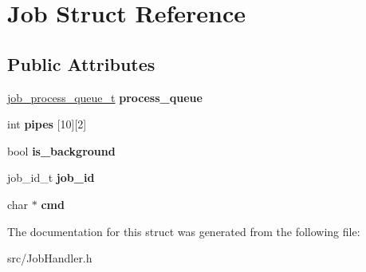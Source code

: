 \hypertarget{structJob}{\section{Job Struct Reference}
\label{structJob}
}
\subsection*{Public Attributes}
\begin{DoxyCompactItemize}
\item 
\hypertarget{structJob_ad0568dd2a8478c66222444a3b61c899b}{\hyperlink{structjob__process__queue__t}{job\-\_\-process\-\_\-queue\-\_\-t} {\bfseries process\-\_\-queue}}\label{structJob_ad0568dd2a8478c66222444a3b61c899b}

\item 
\hypertarget{structJob_a758ded01c588f234e0cba81f41842b72}{int {\bfseries pipes} \mbox{[}10\mbox{]}\mbox{[}2\mbox{]}}\label{structJob_a758ded01c588f234e0cba81f41842b72}

\item 
\hypertarget{structJob_a5a39e51fcc0b4a85fb37a205c7ff08fe}{bool {\bfseries is\-\_\-background}}\label{structJob_a5a39e51fcc0b4a85fb37a205c7ff08fe}

\item 
\hypertarget{structJob_ab93d72c1f2dfa4f987bbccd010060422}{job\-\_\-id\-\_\-t {\bfseries job\-\_\-id}}\label{structJob_ab93d72c1f2dfa4f987bbccd010060422}

\item 
\hypertarget{structJob_aef40af5b52f92ed8019f5db2b5dff77b}{char $\ast$ {\bfseries cmd}}\label{structJob_aef40af5b52f92ed8019f5db2b5dff77b}

\end{DoxyCompactItemize}


The documentation for this struct was generated from the following file\-:\begin{DoxyCompactItemize}
\item 
src/Job\-Handler.\-h\end{DoxyCompactItemize}

